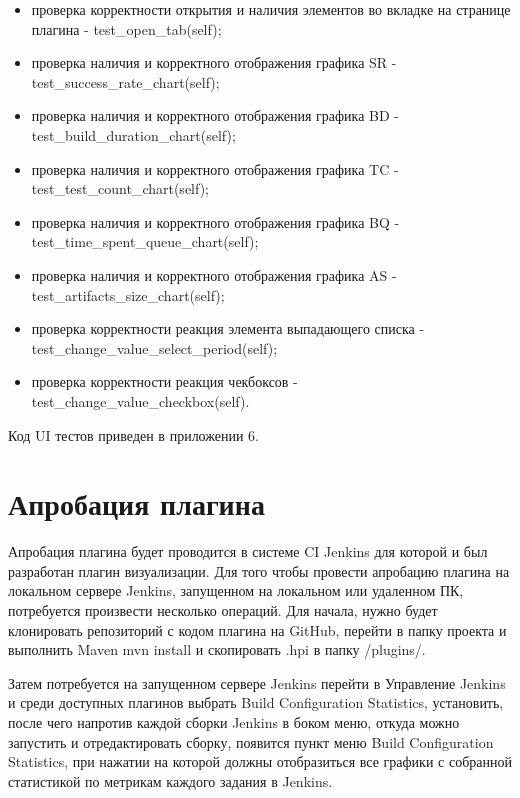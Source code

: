 \begin{itemize}
	\item проверка корректности открытия и наличия элементов во вкладке на странице плагина - test\_open\_tab(self);
	\item проверка наличия и корректного отображения графика SR - test\_success\_rate\_chart(self);
	\item проверка наличия и корректного отображения графика BD - test\_build\_duration\_chart(self);
	\item проверка наличия и корректного отображения графика TC - test\_test\_count\_chart(self);
	\item проверка наличия и корректного отображения графика BQ - test\_time\_spent\_queue\_chart(self);
	\item проверка наличия и корректного отображения графика AS - test\_artifacts\_size\_chart(self);
	\item проверка корректности реакция элемента выпадающего списка - test\_change\_value\_select\_period(self);
	\item проверка  корректности реакция чекбоксов - test\_change\_value\_checkbox(self).
\end{itemize}

Код UI тестов приведен в приложении 6.



 \section{Апробация плагина} \label{ch4:sec2}
 
 Апробация плагина будет проводится в системе CI Jenkins для которой и был разработан плагин визуализации. Для того чтобы провести апробацию плагина на локальном сервере Jenkins, запущенном на локальном или удаленном ПК, потребуется произвести несколько операций. Для начала, нужно будет клонировать репозиторий с кодом плагина на GitHub, перейти в папку проекта и выполнить \cite{deployplugin} Maven mvn install и скопировать .hpi в папку /plugins/. 
 
 Затем потребуется на запущенном сервере Jenkins перейти в Управление Jenkins  и среди доступных плагинов выбрать Build Configuration Statistics, установить, после чего напротив каждой сборки Jenkins в боком меню, откуда можно запустить и отредактировать сборку, появится пункт меню Build Configuration Statistics, при нажатии на которой должны отобразиться все графики с собранной статистикой по метрикам каждого задания в Jenkins. 
 
